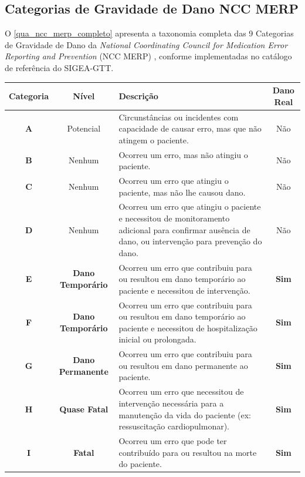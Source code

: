\begin{anexosenv}

\partanexos

\chapter{Categorias de Gravidade de Dano NCC MERP}
\label{anex_ncc_merp}

O \autoref{qua_ncc_merp_completo} apresenta a taxonomia completa das
9 Categorias de Gravidade de Dano da \textit{National Coordinating Council
for Medication Error Reporting and Prevention} (NCC MERP) \cite{nccmerp2001},
conforme implementadas no catálogo de referência do SIGEA-GTT.

\begin{quadro}[htb]
\centering
\small
\caption{Categorias de Gravidade de Dano NCC MERP (A a I).}
\label{qua_ncc_merp_completo}
\begin{tabularx}{\textwidth}{c c X c}
\toprule
\textbf{Categoria} & \textbf{Nível} & \textbf{Descrição} & \textbf{Dano Real} \\
\midrule
\textbf{A} & Potencial &
  Circunstâncias ou incidentes com capacidade de causar erro,
  mas que não atingem o paciente. & Não \\
\midrule
\textbf{B} & Nenhum &
  Ocorreu um erro, mas não atingiu o paciente. & Não \\
\midrule
\textbf{C} & Nenhum &
  Ocorreu um erro que atingiu o paciente, mas não lhe causou dano. & Não \\
\midrule
\textbf{D} & Nenhum &
  Ocorreu um erro que atingiu o paciente e necessitou de monitoramento
  adicional para confirmar ausência de dano, ou intervenção para
  prevenção do dano. & Não \\
\midrule
\textbf{E} & \textbf{Dano Temporário} &
  Ocorreu um erro que contribuiu para ou resultou em dano temporário
  ao paciente e necessitou de intervenção. & \textbf{Sim} \\
\midrule
\textbf{F} & \textbf{Dano Temporário} &
  Ocorreu um erro que contribuiu para ou resultou em dano temporário
  ao paciente e necessitou de hospitalização inicial ou prolongada. & \textbf{Sim} \\
\midrule
\textbf{G} & \textbf{Dano Permanente} &
  Ocorreu um erro que contribuiu para ou resultou em dano permanente
  ao paciente. & \textbf{Sim} \\
\midrule
\textbf{H} & \textbf{Quase Fatal} &
  Ocorreu um erro que necessitou de intervenção necessária para a
  manutenção da vida do paciente (ex: ressuscitação cardiopulmonar). & \textbf{Sim} \\
\midrule
\textbf{I} & \textbf{Fatal} &
  Ocorreu um erro que pode ter contribuído para ou resultou na morte
  do paciente. & \textbf{Sim} \\
\bottomrule
\end{tabularx}
\end{quadro}


\end{anexosenv}
